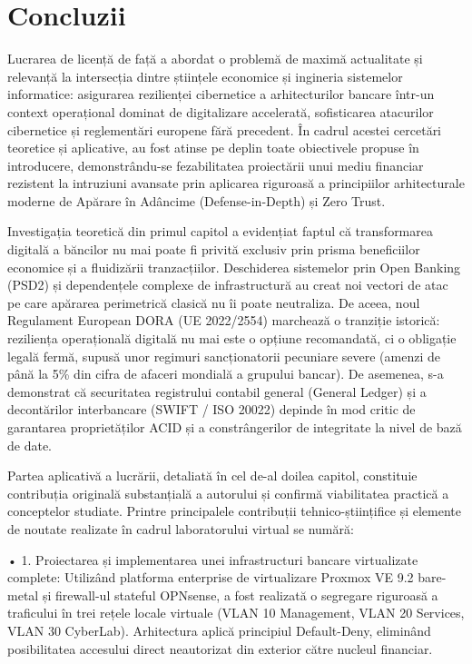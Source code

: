 \chapter*{Concluzii}

Lucrarea de licență de față a abordat o problemă de maximă actualitate și relevanță la intersecția dintre științele economice și ingineria sistemelor informatice: asigurarea rezilienței cibernetice a arhitecturilor bancare într-un context operațional dominat de digitalizare accelerată, sofisticarea atacurilor cibernetice și reglementări europene fără precedent. În cadrul acestei cercetări teoretice și aplicative, au fost atinse pe deplin toate obiectivele propuse în introducere, demonstrându-se fezabilitatea proiectării unui mediu financiar rezistent la intruziuni avansate prin aplicarea riguroasă a principiilor arhitecturale moderne de Apărare în Adâncime (Defense-in-Depth) și Zero Trust.

Investigația teoretică din primul capitol a evidențiat faptul că transformarea digitală a băncilor nu mai poate fi privită exclusiv prin prisma beneficiilor economice și a fluidizării tranzacțiilor. Deschiderea sistemelor prin Open Banking (PSD2) și dependențele complexe de infrastructură au creat noi vectori de atac pe care apărarea perimetrică clasică nu îi poate neutraliza. De aceea, noul Regulament European DORA (UE 2022/2554) marchează o tranziție istorică: reziliența operațională digitală nu mai este o opțiune recomandată, ci o obligație legală fermă, supusă unor regimuri sancționatorii pecuniare severe (amenzi de până la 5\% din cifra de afaceri mondială a grupului bancar). De asemenea, s-a demonstrat că securitatea registrului contabil general (General Ledger) și a decontărilor interbancare (SWIFT / ISO 20022) depinde în mod critic de garantarea proprietăților ACID și a constrângerilor de integritate la nivel de bază de date.

Partea aplicativă a lucrării, detaliată în cel de-al doilea capitol, constituie contribuția originală substanțială a autorului și confirmă viabilitatea practică a conceptelor studiate. Printre principalele contribuții tehnico-științifice și elemente de noutate realizate în cadrul laboratorului virtual se numără:

• 1. Proiectarea și implementarea unei infrastructuri bancare virtualizate complete: Utilizând platforma enterprise de virtualizare Proxmox VE 9.2 bare-metal și firewall-ul stateful OPNsense, a fost realizată o segregare riguroasă a traficului în trei rețele locale virtuale (VLAN 10 Management, VLAN 20 Services, VLAN 30 CyberLab). Arhitectura aplică principiul Default-Deny, eliminând posibilitatea accesului direct neautorizat din exterior către nucleul financiar.

